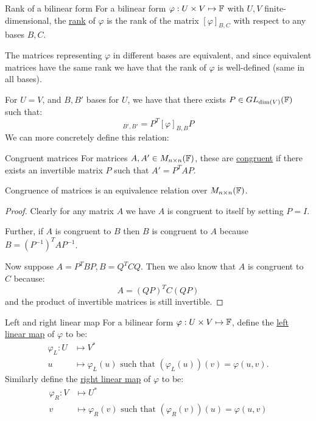 \documentclass[../Main.tex]{subfiles}
\begin{document}
\begin{definition}{Rank of a bilinear form}
    For a bilinear form $\varphi : U \times V \mapsto \mathbb{F}$ with $U, V$ finite-dimensional, the \underline{rank} of $\varphi$ is the rank of the matrix $[\varphi]_{B, C}$ with respect to any bases $B, C$.
\end{definition}
The matrices representing $\varphi$ in different bases are equivalent, and since equivalent matrices have the same rank we have that the rank of $\varphi$ is well-defined (same in all bases).

For $U = V$, and $B, B'$ bases for $U$, we have that there exists $P \in GL_{\dim(V)}(\mathbb{F})$ such that:
\begin{equation*}
    [\varphi]_{B', B'} = P^T [\varphi]_{B, B} P
\end{equation*}
We can more concretely define this relation:
\begin{definition}{Congruent matrices}
    For matrices $A, A' \in M_{n \times n}(\mathbb{F})$, these are \underline{congruent} if there exists an invertible matrix $P$ such that $A' = P^T A P$.
\end{definition}
\begin{proposition}
    Congruence of matrices is an equivalence relation over $M_{n \times n}(\mathbb{F})$.
    \label{propCongruenceEquiv}
\end{proposition}
\begin{proof}
    Clearly for any matrix $A$ we have $A$ is congruent to itself by setting $P = I$.

    Further, if $A$ is congruent to $B$ then $B$ is congruent to $A$ because $B = (P^{-1})^T A P^{-1}$.

    Now suppose $A = P^T B P, B = Q^T C Q$. Then we also know that $A$ is congruent to $C$ because:
    \begin{equation*}
        A = (QP)^T C (QP)
    \end{equation*}
    and the product of invertible matrices is still invertible.
\end{proof}
\begin{definition}{Left and right linear map}
    For a bilinear form $\varphi : U \times V \mapsto \mathbb{F}$, define the \underline{left linear map} of $\varphi$ to be:
    \begin{align*}
        \varphi_L : U &\mapsto V^*\\
        u &\mapsto \varphi_L(u) \text{ such that } (\varphi_L(u))(v) = \varphi(u, v).
    \end{align*}
    Similarly define the \underline{right linear map} of $\varphi$ to be:
    \begin{align*}
        \varphi_R : V &\mapsto U^*\\
        v &\mapsto \varphi_R(v) \text{ such that } (\varphi_R(v))(u) = \varphi(u, v)
    \end{align*}
\end{definition}
\end{document}
